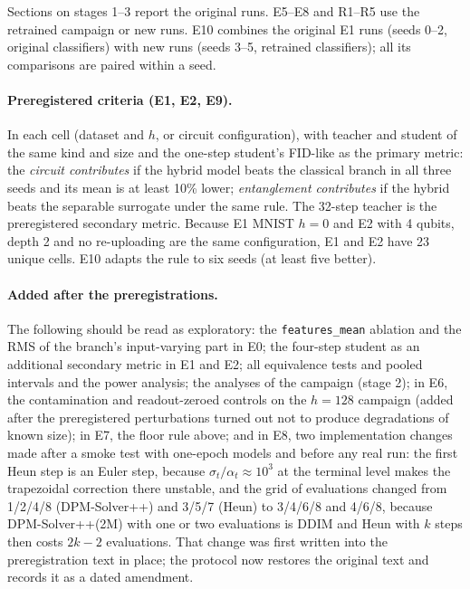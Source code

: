 \documentclass[11pt]{article}
\newcommand{\fidlike}{FID-like}
\begin{document}
Sections on stages 1--3 report the original runs. E5--E8 and R1--R5 use the
retrained campaign or new runs. E10 combines the original E1 runs (seeds 0--2,
original classifiers) with new runs (seeds 3--5, retrained classifiers); all its
comparisons are paired within a seed.

\paragraph{Preregistered criteria (E1, E2, E9).} In each cell (dataset and $h$, or
circuit configuration), with teacher and student of the same kind and size and
the one-step student's \fidlike{} as the primary metric: the \emph{circuit
contributes} if the hybrid model beats the classical branch in all three seeds
and its mean is at least 10\% lower; \emph{entanglement contributes} if the
hybrid beats the separable surrogate under the same rule. The 32-step teacher is
the preregistered secondary metric. Because E1 MNIST $h=0$ and E2 with 4 qubits,
depth 2 and no re-uploading are the same configuration, E1 and E2 have 23 unique
cells. E10 adapts the rule to six seeds (at least five better).

\paragraph{Added after the preregistrations.} The following should be read as
exploratory: the \texttt{features\_mean} ablation and the RMS of the branch's
input-varying part in E0; the four-step student as an additional secondary metric
in E1 and E2; all equivalence tests and pooled intervals and the power analysis;
the analyses of the campaign (stage 2); in E6, the contamination and
readout-zeroed controls on the $h=128$ campaign (added after the preregistered
perturbations turned out not to produce degradations of known size); in E7, the
floor rule above; and in E8, two implementation changes made after a smoke test
with one-epoch models and before any real run: the first Heun step is an Euler
step, because $\sigma_t/\alpha_t\approx10^3$ at the terminal level makes the
trapezoidal correction there unstable, and the grid of evaluations changed from
1/2/4/8 (DPM-Solver++) and 3/5/7 (Heun) to 3/4/6/8 and 4/6/8, because
DPM-Solver++(2M) with one or two evaluations is DDIM and Heun with $k$ steps then
costs $2k-2$ evaluations. That change was first written into the preregistration
text in place; the protocol now restores the original text and records it as a
dated amendment.
\end{document}
